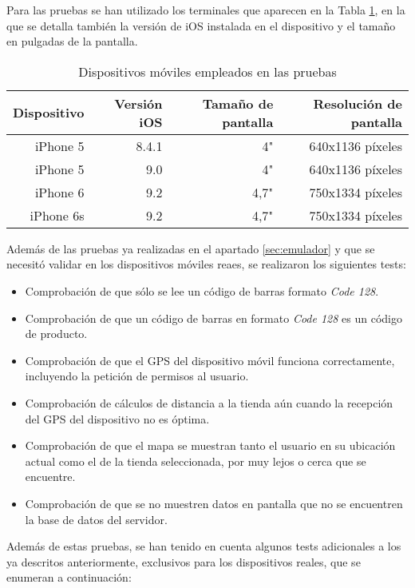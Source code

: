 Para las pruebas se han utilizado los terminales que aparecen en la Tabla \ref{tab:tabla-pruebas}, en la que se detalla también la versión de iOS instalada en el dispositivo y el tamaño en pulgadas de la pantalla.

\begin{table}[htbp]
  \centering
      \begin{tabular}{rrrr}
    \toprule
    Dispositivo & Versión iOS & Tamaño de pantalla & Resolución de pantalla \\
    \midrule
    iPhone 5 & 8.4.1 & 4"    & 640x1136 píxeles \\
    iPhone 5 & 9.0   & 4"    & 640x1136 píxeles \\
    iPhone 6 & 9.2   & 4,7"  & 750x1334 píxeles \\
    iPhone 6s & 9.2   & 4,7"  & 750x1334 píxeles \\
    \bottomrule
    \end{tabular}%
    \caption{Dispositivos móviles empleados en las pruebas}
  \label{tab:tabla-pruebas}%
\end{table}%

Además de las pruebas ya realizadas en el apartado \ref{sec:emulador} y que se necesitó validar en los dispositivos móviles reaes, se realizaron los siguientes tests:
\begin{itemize}
	\item Comprobación de que sólo se lee un código de barras formato \textit{Code 128}.
	\item Comprobación de que un código de barras en formato \textit{Code 128} es un código de producto.
	\item Comprobación de que el GPS del dispositivo móvil funciona correctamente, incluyendo la petición de permisos al usuario.
	\item Comprobación de cálculos de distancia a la tienda aún cuando la recepción del GPS del dispositivo no es óptima.
	\item Comprobación de que el mapa se muestran tanto el usuario en su ubicación actual como el de la tienda seleccionada, por muy lejos o cerca que se encuentre.
	\item Comprobación de que se no muestren datos en pantalla que no se encuentren la base de datos del servidor.
\end{itemize}

Además de estas pruebas, se han tenido en cuenta algunos tests adicionales a los ya descritos anteriormente, exclusivos para los dispositivos reales, que se enumeran a continuación:

